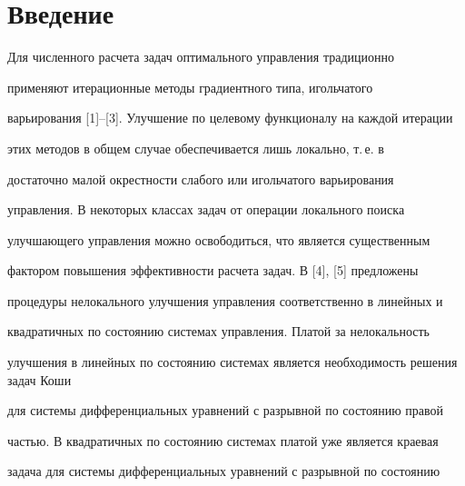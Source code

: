 \pagestyle{plain} %







\maketitle


\label{begin}











\section{Введение}





Для численного расчета задач оптимального управления традиционно


применяют итерационные методы градиентного типа, игольчатого


варьирования [1]--[3]. Улучшение по целевому функционалу на каждой итерации


этих методов в общем случае обеспечивается лишь локально, т.\,е. в


достаточно малой окрестности слабого или игольчатого варьирования


управления. В некоторых классах задач от операции локального поиска


улучшающего управления можно освободиться, что является существенным


фактором повышения эффективности расчета задач. В [4], [5] предложены


процедуры нелокального улучшения управления соответственно в линейных и


квадратичных по состоянию системах управления. Платой за нелокальность


улучшения в линейных по состоянию системах является необходимость решения задач Коши


для системы дифференциальных уравнений с разрывной по состоянию правой


частью. В квадратичных по состоянию системах платой уже является краевая


задача для системы дифференциальных уравнений с разрывной по состоянию



